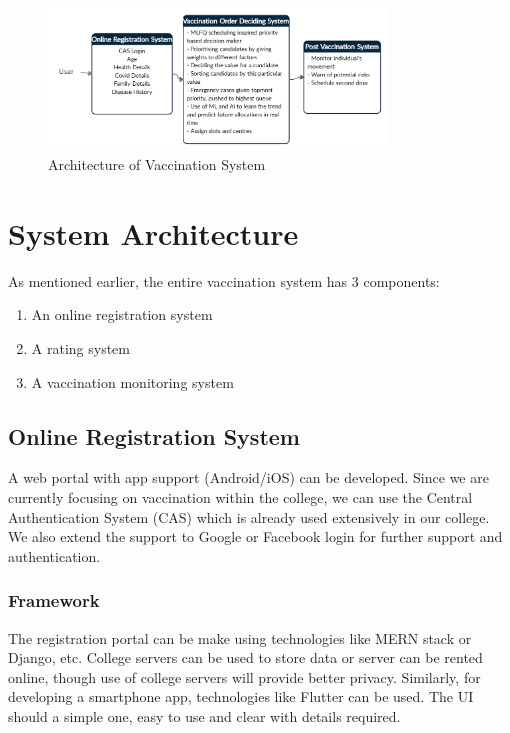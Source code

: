 \documentclass[10pt,twocolumn,letterpaper]{article}
\begin{document}
\begin{figure}[htp]
	\includegraphics[width=9cm]{./images/Systems_Architecture.png}
	\caption{Architecture of Vaccination System}
	\label{fig:galaxy}
\end{figure}

\section{System Architecture}

As mentioned earlier, the entire vaccination system has 3 components:
\begin{enumerate}
	\item An online registration system
	\item  A rating system
	\item  A vaccination monitoring system
\end{enumerate}

\subsection{ Online Registration System}
A web portal with app support (Android/iOS) can be developed. Since we are currently focusing on vaccination within the college, we can use the Central Authentication System (CAS) which is already used extensively in our college. We also extend the support to Google or Facebook login for further support and authentication.

\subsubsection{Framework}
The registration portal can be make using technologies like MERN stack or Django, etc. College servers can be used to store data or server can be rented online, though use of college servers will provide better privacy. Similarly, for developing a smartphone app, technologies like Flutter can be used. The UI should a simple one, easy to use and clear with details required.
\end{document}
